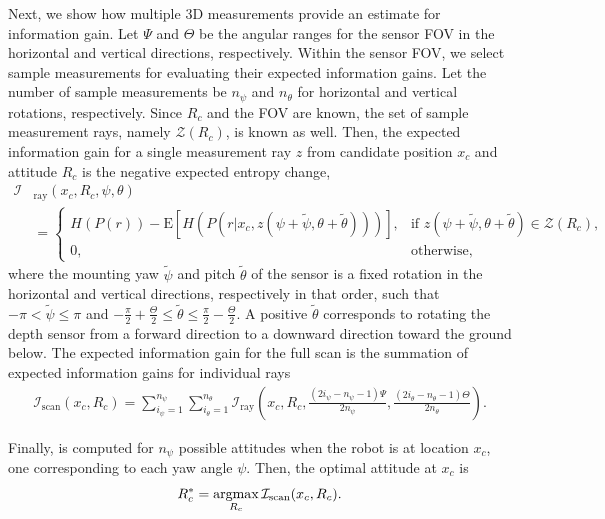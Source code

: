 Next, we show how multiple 3D measurements provide an estimate for information gain. Let $\Psi$ and $\Theta$ be the angular ranges for the sensor FOV in the horizontal and vertical directions, respectively. Within the sensor FOV, we select sample measurements for evaluating their expected information gains. Let the number of sample measurements be $n_\psi$ and $n_\theta$ for horizontal and vertical rotations, respectively. Since $R_c$ and the FOV are known, the set of sample measurement rays, namely $\mathcal{Z}(R_c)$, is known as well. Then, the expected information gain for a single measurement ray $z$ from candidate position $x_c$ and attitude $R_c$ is the negative expected entropy change,
\begin{align}
\label{eqn:Iray}
\mathcal{I}&_\text{ray}(x_c,R_c,\psi,\theta)\nonumber\\&=
\begin{cases}
H(P(r))-\text{E}[H(P(r|x_c,z(\psi+\tilde{\psi},\theta+\tilde{\theta})))], & \mbox{if } z(\psi+\tilde{\psi},\theta+\tilde{\theta})\in\mathcal{Z}(R_c), \\ 
0,                                                                                    & \mbox{otherwise},
\end{cases}
\end{align}
where the mounting yaw $\tilde{\psi}$ and pitch $\tilde{\theta}$ of the sensor is a fixed rotation in the horizontal and vertical directions, respectively in that order, such that $-\pi<\tilde{\psi}\leq\pi$ and $-\frac{\pi}{2}+\frac\Theta2\leq\tilde{\theta}\leq\frac{\pi}{2}-\frac\Theta2$. A positive $\tilde{\theta}$ corresponds to rotating the depth sensor from a forward direction to a downward direction toward the ground below. The expected information gain for the full scan is the summation of expected information gains for individual rays
\begin{align}
\label{eqn:Iscan}
\mathcal{I}_\text{scan}(x_c,R_c)=\sum_{i_\psi=1}^{n_\psi}\sum_{i_\theta=1}^{n_\theta}\mathcal{I}_\text{ray}\left(x_c,R_c,\frac{(2i_\psi-n_\psi-1)\Psi}{2n_\psi},\frac{(2i_\theta-n_\theta-1)\Theta}{2n_\theta}\right).
\end{align}

Finally,  is computed for $n_\psi$ possible attitudes when the robot is at location $x_c$, one corresponding to each yaw angle $\psi$. Then, the optimal attitude at $x_c$ is
\begin{align}
\label{eqn:RcStar}
R_c^*=\argmax_{R_c} \mathcal{I}_\text{scan}(x_c,R_c).
\end{align}

